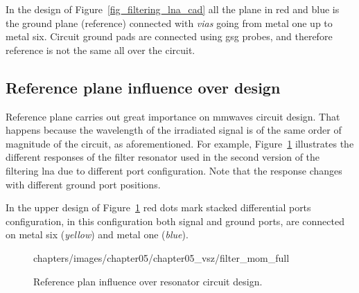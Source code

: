 In the design of Figure~\ref{fig_filtering_lna_cad} all the plane in red and blue is the ground plane (reference) connected with \emph{vias} going from metal one up to metal six. Circuit ground pads are connected using \gls{gsg} probes, and therefore reference is not the same all over the circuit.

\subsection{Reference plane influence over design}

Reference plane carries out great importance on \gls{mmwaves} circuit design. That happens because the wavelength of the irradiated signal is of the same order of magnitude of the circuit, as aforementioned. For example, Figure~\ref{fig_filter_mom_full} illustrates the different responses of the filter resonator used in the second version of the filtering \gls{lna} due to different port configuration. Note that the response changes with different ground port positions.

In the upper design of Figure~\ref{fig_filter_mom_full} red dots mark stacked differential ports configuration, in this configuration both signal and ground ports, are connected on metal six (\emph{yellow}) and metal one (\emph{blue}).

\begin{figure}[!hbt]
\centering
	\begin{overpic}[scale=1]{chapters/images/chapter05/chapter05_vsz/filter_mom_full}
	\end{overpic}
\caption{Reference plan influence over resonator circuit design.}
\label{fig_filter_mom_full}
\end{figure}


